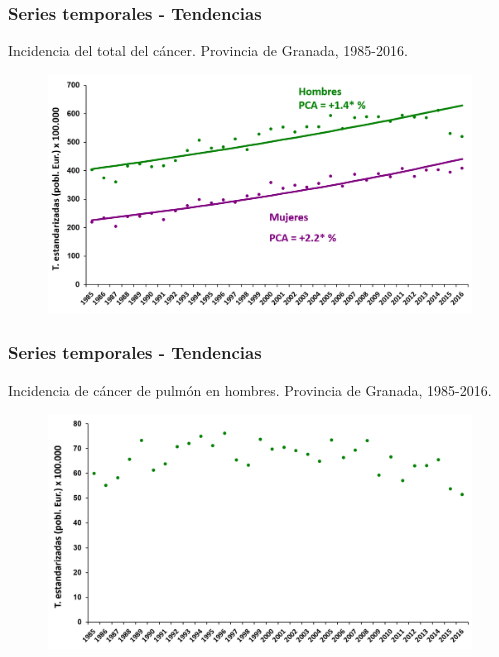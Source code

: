\documentclass{beamer}
\begin{document}
\begin{frame}\frametitle{Series temporales - Tendencias}
	\centering
	Incidencia del total del cáncer. Provincia de Granada, 1985-2016.
	\begin{figure}
		\centering
		\includegraphics[width=\textwidth]{images/tendencias1.png}
	\end{figure}
\end{frame}


\begin{frame}\frametitle{Series temporales - Tendencias}
	\centering
	Incidencia de cáncer de pulmón en hombres. Provincia de Granada, 1985-2016.
	\begin{figure}
		\centering
		\includegraphics[width=\textwidth]{images/tendencias_pulmon0.png}
	\end{figure}
\end{frame}

\end{document}
